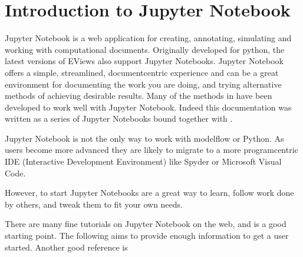 \documentclass[letterpaper,10pt,english]{jupyterBook}
\begin{document}
\chapter{Introduction to  Jupyter Notebook}
\label{\detokenize{content/04_PythonEssentials/Intro_Jupyter_notebook:introduction-to-jupyter-notebook}}\label{\detokenize{content/04_PythonEssentials/Intro_Jupyter_notebook::doc}}
\sphinxAtStartPar
Jupyter Notebook is a web application for creating, annotating, simulating and working with computational documents.  Originally developed for python, the latest versions of EViews also support Jupyter Notebooks. Jupyter Notebook offers a simple, streamlined, document\sphinxhyphen{}centric experience and can be a great environment for documenting the work you are doing, and trying alternative methods of achieving desirable results.  Many of the methods in  have been developed to work well with Jupyter Notebook. Indeed this documentation was written as a series of Jupyter Notebooks bound together with .

\sphinxAtStartPar
Jupyter Notebook is not the only way to work with modelflow or Python.  As users become more advanced they are likely to migrate to a more program\sphinxhyphen{}centric IDE (Interactive Development Environment) like Spyder or Microsoft Visual Code.

\sphinxAtStartPar
However, to start Jupyter Notebooks are a great way to learn, follow work done by others, and tweak them to fit your own needs.

\sphinxAtStartPar
There are many fine tutorials on Jupyter Notebook on the web, and  is a good starting point. The following aims to provide enough information to get a user started.  Another good reference is 
\end{document}

